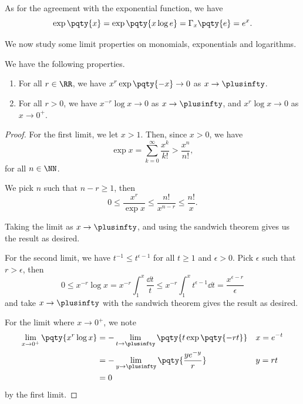 As for the agreement with the exponential function, we have
\[
    \exp\pqty{x} = \exp\pqty{x \log e} = \Gamma_x \pqty{e} = e^x.
\]

We now study some limit properties on monomials, exponentials and logarithms.

\begin{proposition}
    \label{prop:lim-prop-monomial-exponential-logarithm}%
    We have the following properties.
    \begin{enumerate}
        \item {} For all \(r \in \RR\), we have \(x^r \exp\pqty{-x} \to 0\) as \(x \to \plusinfty\).
        \item {} For all \(r > 0\), we have \(x^{-r} \log x \to 0\) as \(x \to \plusinfty\), and \(x^r \log x \to 0\) as \(x \to 0^+\).
    \end{enumerate}
\end{proposition}

\begin{proof}
    For the first limit, we let \(x > 1\). Then, since \(x > 0\), we have
    \[
        \exp x = \sum_{k = 0}^{\infty} \frac{x^k}{k!} > \frac{x^n}{n!},
    \]  
    for all \(n \in \NN\).

    We pick \(n\) such that \(n - r \geq 1\), then
    \[
        0 \leq \frac{x^r}{\exp x} \leq \frac{n!}{x^{n - r}} \leq \frac{n!}{x}.
    \]

    Taking the limit as \(x \to \plusinfty\), and using the sandwich theorem gives us the result as desired.

    For the second limit, we have \(t^{-1} \leq t^{\epsilon - 1}\) for all \(t \geq 1\) and \(\epsilon > 0\). Pick \(\epsilon\) such that \(r > \epsilon\), then
    \[
        0 \leq x^{-r} \log x = x^{-r} \int_{1}^{x} \frac{\dd{t}}{t} \leq x^{-r} \int_{1}^{x} t^{\epsilon - 1} \dd{t} = \frac{x^{\epsilon - r}}{\epsilon}
    \]
    and take \(x \to \plusinfty\) with the sandwich theorem gives the result as desired.

    For the limit where \(x \to 0^+\), we note
    \begin{align*}
        \lim_{x \to 0^+} \pqty{x^r \log x} &= - \lim_{t \to \plusinfty} \pqty{t \exp \pqty{- rt}} && x = e^{-t} \\
        &= - \lim_{y \to \plusinfty} \pqty{\frac{y e^{-y}}{r}} && y = rt \\
        &= 0
    \end{align*}
    by the first limit.
\end{proof}

